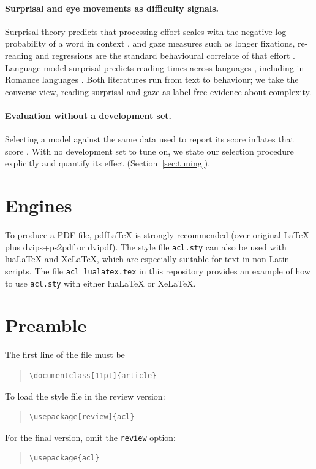 \paragraph{Surprisal and eye movements as difficulty signals.}
Surprisal theory predicts that processing effort scales with the
negative log probability of a word in context \citep{hale2001probabilistic},
and gaze measures such as longer fixations, re-reading and regressions
are the standard behavioural correlate of that effort
\citep{rayner1998eye}. Language-model surprisal predicts reading times
across languages \citep{hollenstein-etal-2021-multilingual}, including
in Romance languages \citep{alves-2025-benchmarking}. Both literatures
run from text to behaviour; we take the converse view, reading surprisal
and gaze as label-free evidence about complexity.

\paragraph{Evaluation without a development set.}
Selecting a model against the same data used to report its score inflates
that score \citep{gorman-bedrick-2019-need}. With no development set to
tune on, we state our selection procedure explicitly and quantify its
effect (Section~\ref{sec:tuning}).

\section{Engines}

To produce a PDF file, pdf\LaTeX{} is strongly recommended (over original \LaTeX{} plus dvips+ps2pdf or dvipdf).
The style file \texttt{acl.sty} can also be used with
lua\LaTeX{} and
Xe\LaTeX{}, which are especially suitable for text in non-Latin scripts.
The file \texttt{acl\_lualatex.tex} in this repository provides
an example of how to use \texttt{acl.sty} with either
lua\LaTeX{} or
Xe\LaTeX{}.

\section{Preamble}

The first line of the file must be
\begin{quote}
\begin{verbatim}
\documentclass[11pt]{article}
\end{verbatim}
\end{quote}

To load the style file in the review version:
\begin{quote}
\begin{verbatim}
\usepackage[review]{acl}
\end{verbatim}
\end{quote}
For the final version, omit the \verb|review| option:
\begin{quote}
\begin{verbatim}
\usepackage{acl}
\end{verbatim}
\end{quote}

